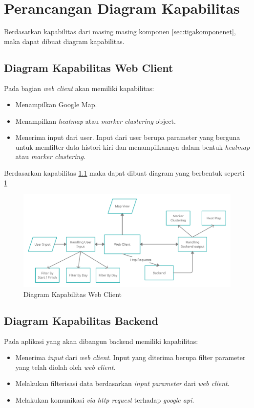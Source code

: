 \section{Perancangan Diagram Kapabilitas}
\label{sec:kapabilitasDiagram}
Berdasarkan kapabilitas dari masing masing komponen \ref{sec:tigakomponenet}, maka dapat dibuat diagram kapabilitas.

\subsection{Diagram Kapabilitas Web Client}
\label{sec:webclientCapability}
Pada bagian \textit{web client} akan memiliki kapabilitas:
\begin{itemize}
    \item Menampilkan Google Map.
    \item Menampilkan \textit{heatmap} atau \textit{marker clustering} object.
    \item Menerima input dari user. Input dari user berupa parameter yang berguna untuk memfilter data histori kiri dan menampilkannya dalam bentuk \textit{heatmap} atau \textit{marker clustering}.
\end{itemize}

Berdasarkan kapabilitas \ref{sec:webclientCapability} maka dapat dibuat diagram yang berbentuk seperti \ref{fig:webclientcapabiltydiagram}

\begin{figure}[H]
	\centering  
	\includegraphics[scale=0.25]{Gambar/kiri_web_client_capability.png}  
	\caption[Rancangan Diagram Kapabilitas]{Diagram Kapabilitas Web Client} 
	\label{fig:webclientcapabiltydiagram} 
\end{figure}

\subsection{Diagram Kapabilitas Backend}
\label{sec:backendCapabilityDiagram}
Pada aplikasi yang akan dibangun backend memiliki kapabilitas:
\begin{itemize}
    \item Menerima \textit{input} dari \textit{web client}. Input yang diterima berupa filter parameter yang telah diolah oleh \textit{web client}.
    \item Melakukan filterisasi data berdasarkan \textit{input parameter} dari \textit{web client}.
    \item Melakukan komunikasi \textit{via http request} terhadap \textit{google api}.
\end{itemize}

